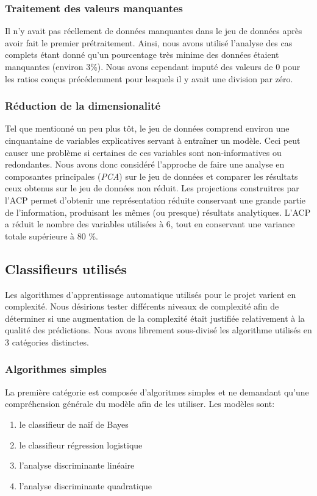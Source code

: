 \subsubsection{Traitement des valeurs manquantes}
Il n'y avait pas réellement de données manquantes dans le jeu de données après avoir fait le premier prétraitement. Ainsi, nous avons utilisé l'analyse des cas complets étant donné qu'un pourcentage très minime des données étaient manquantes (environ 3\%). Nous avons cependant imputé des valeurs de 0 pour les ratios conçus précédemment pour lesquels il y avait une division par zéro.

\subsubsection{Réduction de la dimensionalité}
Tel que mentionné un peu plus tôt, le jeu de données comprend environ une cinquantaine de variables explicatives servant à entraîner un modèle. Ceci peut causer une problème si certaines de ces variables sont non-informatives ou redondantes. Nous avons donc considéré l'approche de faire une analyse en composantes principales (\textit{PCA}) sur le jeu de données et comparer les résultats ceux obtenus sur le jeu de données non réduit. Les projections construitres par l'ACP permet d'obtenir une représentation réduite conservant une grande partie de l'information, produisant les mêmes (ou presque) résultats analytiques. L'ACP a réduit le nombre des variables utilisées à 6, tout en conservant une variance totale supérieure à 80 \%.

\subsection{Classifieurs utilisés}
Les algorithmes d'apprentissage automatique utilisés pour le projet varient en complexité. Nous désirions tester différents niveaux de complexité afin de déterminer si une augmentation de la complexité était justifiée relativement à la qualité des prédictions. Nous avons librement sous-divisé les algorithme utilisés en 3 catégories distinctes.

\subsubsection{Algorithmes simples}
La première catégorie est composée d'algoritmes simples et ne demandant qu'une compréhension générale du modèle afin de les utiliser. Les modèles sont:

\begin{enumerate}
  \item le classifieur de naïf de Bayes
  \item le classifieur régression logistique
  \item l'analyse discriminante linéaire
  \item l'analyse discriminante quadratique 
\end{enumerate}

